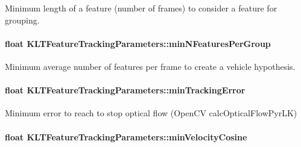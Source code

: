 Minimum length of a feature (number of frames) to consider a feature for grouping. 

\hypertarget{structKLTFeatureTrackingParameters_a566bca052479db63d09155290e1e9106}{
\paragraph[{min\-N\-Features\-Per\-Group}]{\setlength{\rightskip}{0pt plus 5cm}float K\-L\-T\-Feature\-Tracking\-Parameters\-::min\-N\-Features\-Per\-Group}}\label{structKLTFeatureTrackingParameters_a566bca052479db63d09155290e1e9106}


Minimum average number of features per frame to create a vehicle hypothesis. 

\hypertarget{structKLTFeatureTrackingParameters_a52dd1c8d9b949260f7715f5fa705217e}{
\paragraph[{min\-Tracking\-Error}]{\setlength{\rightskip}{0pt plus 5cm}float K\-L\-T\-Feature\-Tracking\-Parameters\-::min\-Tracking\-Error}}\label{structKLTFeatureTrackingParameters_a52dd1c8d9b949260f7715f5fa705217e}


Minimum error to reach to stop optical flow (Open\-C\-V calc\-Optical\-Flow\-Pyr\-L\-K) 

\hypertarget{structKLTFeatureTrackingParameters_a21ffaaa5b36521d31550438b6248b48d}{
\paragraph[{min\-Velocity\-Cosine}]{\setlength{\rightskip}{0pt plus 5cm}float K\-L\-T\-Feature\-Tracking\-Parameters\-::min\-Velocity\-Cosine}}\label{structKLTFeatureTrackingParameters_a21ffaaa5b36521d31550438b6248b48d}


